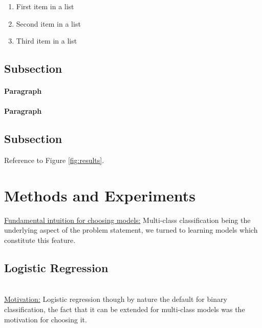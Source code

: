 \documentclass[fleqn,10pt]{SelfArx} %
\begin{document}
\begin{enumerate}[noitemsep] %
\item First item in a list
\item Second item in a list
\item Third item in a list
\end{enumerate}

\subsection{Subsection}

\lipsum[6] %

\paragraph{Paragraph} \lipsum[7] %
\paragraph{Paragraph} \lipsum[8] %

\subsection{Subsection}



Reference to Figure \ref{fig:results}.

\section{Methods and Experiments} %

\underline{Fundamental intuition for choosing models:} Multi-class classification being the underlying aspect of the problem statement, we turned to learning models which constitute this feature.

\subsection{Logistic Regression}~\\
\underline{Motivation:} Logistic regression though by nature the default for binary classification, the fact that it can be extended for multi-class models was the motivation for choosing it.
\end{document}
